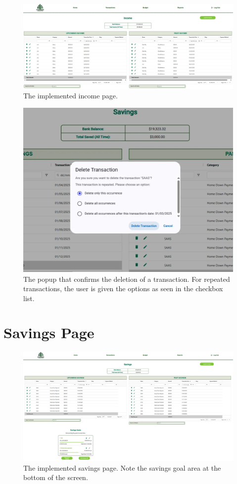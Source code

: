 \documentclass{l4proj}
\begin{document}
\begin{appendices}
\begin{figure}[H]
    \centering
    \includegraphics[width=\linewidth]{images/UI-Screenshots/income-page.png}
    \caption{The implemented income page.}
    \label{fig:reports-page}
\end{figure}

\begin{figure}[htb]
    \centering
    \includegraphics[width=0.5\linewidth]{images/UI-Screenshots/delete-transaction.png}
    \caption{The popup that confirms the deletion of a transaction. For repeated transactions, the user is given the options as seen in the checkbox list.}
    \label{fig:transaction-delete}
\end{figure}

\section{Savings Page}
\begin{figure}[H]
    \centering
    \includegraphics[width=\linewidth]{images/UI-Screenshots/savings-page.png}
    \caption{The implemented savings page. Note the savings goal area at the bottom of the screen.}
    \label{fig:reports-page}
\end{figure}


\end{appendices}
\end{document}
